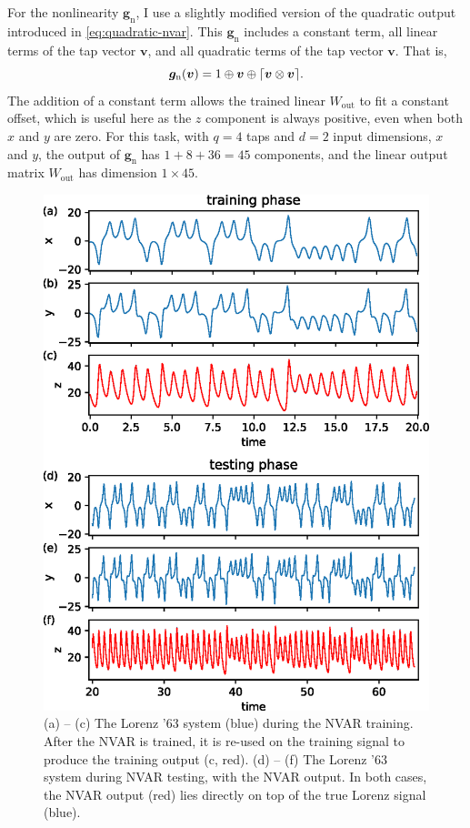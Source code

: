 For the nonlinearity $\bm{g}_\text{n}$, I use a slightly modified
version of the quadratic output introduced in
\cref{eq:quadratic-nvar}. This $\bm{g}_\text{n}$ includes a constant
term, all linear terms of the tap vector $\bm{v}$, and all quadratic
terms of the tap vector $\bm{v}$. That is,
\begin{equation}
  \label{eq:quadratic-nvar-const}
  \bm{g}_\text{n}(\bm{v}) = 1 \oplus \bm{v} \oplus \lceil\bm{v} \otimes \bm{v}\rceil.
\end{equation}
The addition of a constant term allows the trained linear
$W_\text{out}$ to fit a constant offset, which is useful here as the
$z$ component is always positive, even when both $x$ and $y$ are zero.
For this task, with $q = 4$ taps and $d = 2$ input dimensions, $x$ and $y$, the
output of $\bm{g}_\text{n}$ has $1 + 8 + 36 = 45$ components, and the linear
output matrix $W_\text{out}$ has dimension $1 \times 45$.

\begin{figure}
  \includegraphics{figures/nvar-infer-lorenz}
  \caption{(a) -- (c) The Lorenz '63 system (blue) during the NVAR
    training. After the NVAR is trained, it is re-used on the
    training signal to produce the training output (c, red). (d) --
    (f) The Lorenz '63 system during NVAR testing, with the NVAR
    output. In both cases, the NVAR output (red) lies directly on top
    of the true Lorenz signal (blue).}
  \label{fig:nvar-infer-lorenz}
\end{figure}

